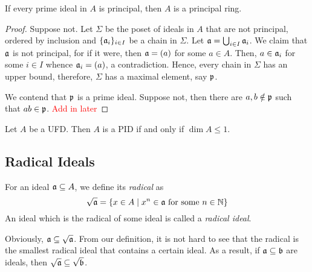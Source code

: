 \begin{proposition}
    If every prime ideal in $A$ is principal, then $A$ is a principal ring.
\end{proposition}
\begin{proof}
    Suppose not. Let $\Sigma$ be the poset of ideals in $A$ that are not principal, ordered by inclusion and $\{\mathfrak a_i\}_{i\in I}$ be a chain in $\Sigma$. Let $\mathfrak a = \bigcup_{i\in I}\mathfrak a_i$. We claim that $\mathfrak a$ is not principal, for if it were, then $\mathfrak a = (a)$ for some $a\in A$. Then, $a\in\mathfrak a_i$ for some $i\in I$ whence $\mathfrak a_i = (a)$, a contradiction. Hence, every chain in $\Sigma$ has an upper bound, therefore, $\Sigma$ has a maximal element, say $\mathfrak p$.

    We contend that $\mathfrak p$ is a prime ideal. Suppose not, then there are $a,b\notin\mathfrak p$ such that $ab\in\mathfrak p$. \textcolor{red}{Add in later}
\end{proof}

\begin{proposition}
    Let $A$ be a UFD. Then $A$ is a PID if and only if $\dim A\le 1$.
\end{proposition}

\subsection{Radical Ideals}

\begin{definition}
    For an ideal $\mathfrak a\subseteq A$, we define its \textit{radical} as 
    \begin{equation*}
        \sqrt{\mathfrak a} = \{x\in A\mid x^n\in\mathfrak a\text{ for some }n\in\mathbb{N}\}
    \end{equation*}
    An ideal which is the radical of some ideal is called a \textit{radical ideal}.
\end{definition}

Obviously, $\mathfrak a\subseteq\sqrt{\mathfrak a}$. From our definition, it is not hard to see that the radical is the smallest radical ideal that contains a certain ideal. As a result, if $\mathfrak a\subseteq\mathfrak b$ are ideals, then $\sqrt{\mathfrak a}\subseteq\sqrt{\mathfrak b}$.

